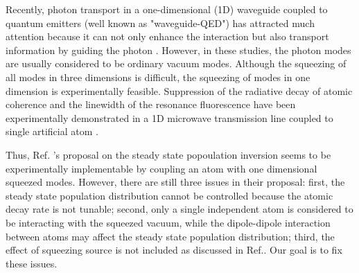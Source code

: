 \documentclass[aps,showpacs,twocolumn,twoside,groupedaddress]{revtex4}
\begin{document}
Recently, photon transport in a one-dimensional (1D) waveguide coupled to quantum emitters (well known as "waveguide-QED") has attracted much attention because it can not only enhance the interaction but also transport information by guiding the photon \cite{shen2005coherent, shen2007strongly, yudson2008multiphoton, liao2015single, liao2016dynamical, liao2016review, roy2017review}. However, in these studies, the photon modes are usually considered to be ordinary vacuum modes. Although the squeezing of all modes in three dimensions is difficult, the squeezing of modes in one dimension is experimentally feasible.  Suppression of the radiative decay of atomic coherence and the linewidth of the resonance fluorescence have been experimentally demonstrated in a 1D microwave transmission line coupled to single artificial atom \cite{turchette1998qa, murch2013kw, toyli2016resonance, bergeal2010analog, wang2018cavity, qin2018exponentially}.  %



Thus, Ref. \cite{ficek1991three, ficek1993two}'s proposal on the steady state popoulation inversion seems to be experimentally implementable by coupling an atom with one dimensional squeezed modes. However, there are still three issues in their proposal: first, the steady state population distribution cannot be controlled because the atomic decay rate is not tunable; second, only a single independent atom is considered to be interacting with the squeezed vacuum, while the dipole-dipole interaction between atoms may affect the steady state population distribution; third, the effect of squeezing source is not included as discussed in Ref.\cite{You2018}. Our goal is to fix these issues.  
\end{document}
